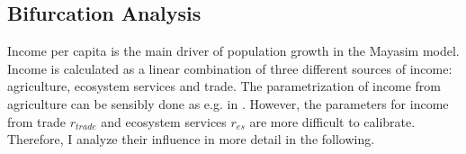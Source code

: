 \subsection{Bifurcation Analysis}

Income per capita is the main driver of population growth in the Mayasim model. Income is calculated as a linear combination of three different sources of income: agriculture, ecosystem services and trade. The parametrization of income from agriculture can be sensibly done as e.g. in \cite{ertsen2018}. However, the parameters for income from trade $r_{trade}$ and ecosystem services $r_{es}$ are more difficult to calibrate. Therefore, I analyze their influence in more detail in the following.


